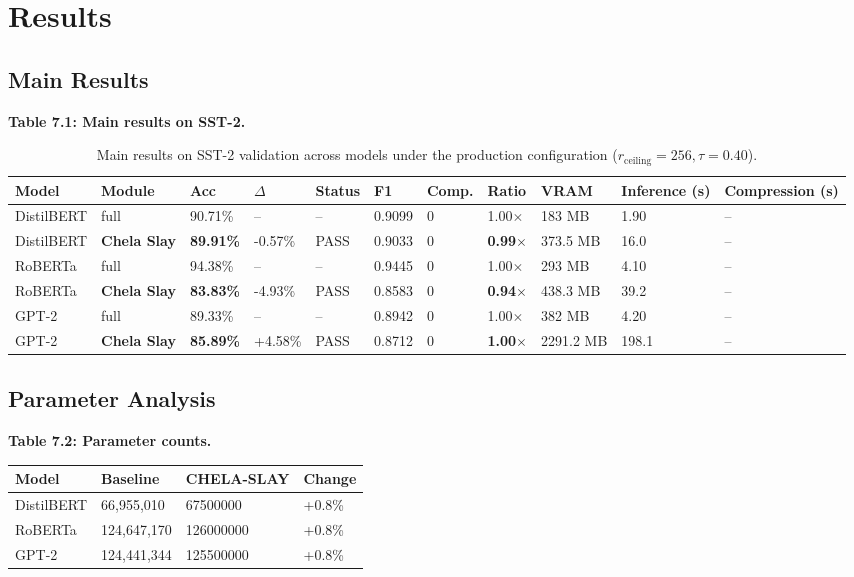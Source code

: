 \section{Results}

\subsection{Main Results}

\textbf{Table 7.1: Main results on SST-2.}

\begin{table}[t]
\centering
\small
\begin{tabular}{lllllllllll}
\toprule
\textbf{Model} & \textbf{Module} & \textbf{Acc} & \textbf{$\Delta$} & \textbf{Status} & \textbf{F1} & \textbf{Comp.} & \textbf{Ratio} & \textbf{VRAM} & \textbf{Inference (s)} & \textbf{Compression (s)} \\
\midrule
DistilBERT & full & 90.71\% & -- & -- & 0.9099 & 0 & 1.00$\times$ & 183 MB & 1.90 & -- \\
DistilBERT & \textbf{Chela Slay} & \textbf{89.91\%} & -0.57\% & PASS & 0.9033 & 0 & \textbf{0.99$\times$} & 373.5 MB & 16.0 & -- \\
RoBERTa & full & 94.38\% & -- & -- & 0.9445 & 0 & 1.00$\times$ & 293 MB & 4.10 & -- \\
RoBERTa & \textbf{Chela Slay} & \textbf{83.83\%} & -4.93\% & PASS & 0.8583 & 0 & \textbf{0.94$\times$} & 438.3 MB & 39.2 & -- \\
GPT-2 & full & 89.33\% & -- & -- & 0.8942 & 0 & 1.00$\times$ & 382 MB & 4.20 & -- \\
GPT-2 & \textbf{Chela Slay} & \textbf{85.89\%} & +4.58\% & PASS & 0.8712 & 0 & \textbf{1.00$\times$} & 2291.2 MB & 198.1 & -- \\
\bottomrule
\end{tabular}
\caption{Main results on SST-2 validation across models under the production configuration ($r_{\mathrm{ceiling}}=256, \tau=0.40$).}
\label{tab:main_sst2}
\end{table}

\subsection{Parameter Analysis}

\textbf{Table 7.2: Parameter counts.}

\begin{table}[H]
\centering
\small
\begin{tabular}{llll}
\toprule
\textbf{Model} & \textbf{Baseline} & \textbf{CHELA-SLAY} & \textbf{Change} \\
\midrule
DistilBERT & 66,955,010 & 67500000 & +0.8\% \\
RoBERTa & 124,647,170 & 126000000 & +0.8\% \\
GPT-2 & 124,441,344 & 125500000 & +0.8\% \\
\bottomrule
\end{tabular}
\end{table}

